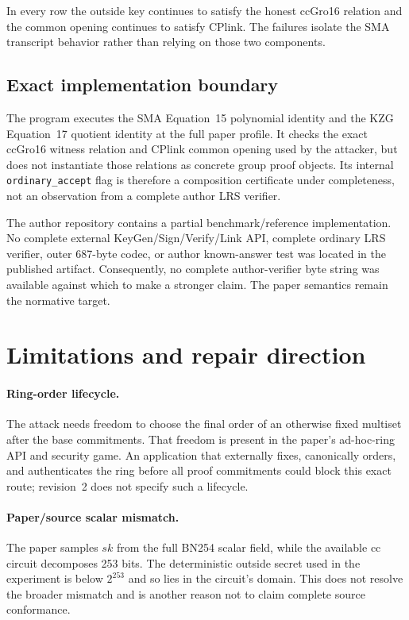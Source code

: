 \documentclass[10pt,a4paper]{article}
\begin{document}
In every row the outside key continues to satisfy the honest ccGro16 relation
and the common opening continues to satisfy CPlink. The failures isolate the
SMA transcript behavior rather than relying on those two components.

\subsection{Exact implementation boundary}

The program executes the SMA Equation~15 polynomial identity and the KZG
Equation~17 quotient identity at the full paper profile. It checks the exact
ccGro16 witness relation and CPlink common opening used by the attacker, but
does not instantiate those relations as concrete group proof objects. Its
internal \texttt{ordinary\_accept} flag is therefore a composition
certificate under completeness, not an observation from a complete author
LRS verifier.

The author repository contains a partial benchmark/reference implementation.
No complete external KeyGen/Sign/Verify/Link API, complete ordinary LRS
verifier, outer 687-byte codec, or author known-answer test was located in the
published artifact. Consequently, no complete author-verifier byte string was
available against which to make a stronger claim. The paper semantics remain
the normative target.

\section{Limitations and repair direction}

\paragraph{Ring-order lifecycle.}
The attack needs freedom to choose the final order of an otherwise fixed
multiset after the base commitments. That freedom is present in the paper's
ad-hoc-ring API and security game. An application that externally fixes,
canonically orders, and authenticates the ring before all proof commitments
could block this exact route; revision~2 does not specify such a lifecycle.

\paragraph{Paper/source scalar mismatch.}
The paper samples $sk$ from the full BN254 scalar field, while the available
cc circuit decomposes 253 bits. The deterministic outside secret used in the
experiment is below $2^{253}$ and so lies in the circuit's domain. This does
not resolve the broader mismatch and is another reason not to claim complete
source conformance.
\end{document}
